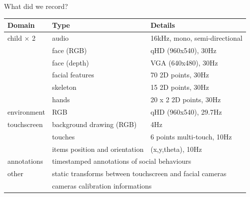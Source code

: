 \documentclass[compress]{beamer}
\begin{document}
\begin{frame}{What did we record?}

\small
\begin{tabular}{@{}lll@{}}
\toprule
\textbf{Domain} & \textbf{Type}                              & \textbf{Details}                          \\ \midrule
child $\times$ 2        & audio                                      & 16kHz, mono, semi-directional             \\
                & face (RGB)                                 & qHD (960x540), 30Hz                       \\
                & face (depth)                               & VGA (640x480), 30Hz                       \\
                & facial features                            & 70 2D points, 30Hz                        \\
                & skeleton                                   & 15 2D points, 30Hz                        \\
                & hands                                      & 20 x 2 2D points, 30Hz                    \\ \midrule
environment     & RGB                                        & qHD (960x540), 29.7Hz                     \\ \midrule
touchscreen     & background drawing (RGB)                   & 4Hz                                       \\
                & touches                                    & 6 points multi-touch, 10Hz                \\
                & items position and orientation             & (x,y,theta), 10Hz                         \\ \midrule
annotations     & \multicolumn{2}{l}{timestamped annotations of social behaviours} \\\midrule
other           & \multicolumn{2}{l}{static transforms between touchscreen and facial cameras}           \\
                & \multicolumn{2}{l}{cameras calibration informations}                                   \\ \bottomrule
\end{tabular}

\end{frame}

\end{document}
